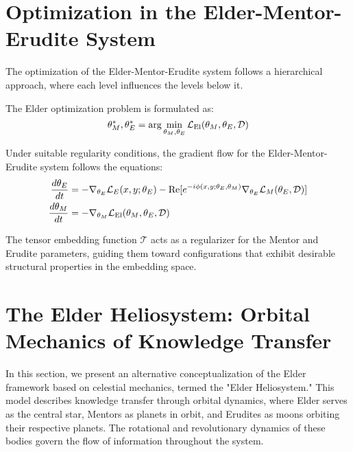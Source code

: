 \section{Optimization in the Elder-Mentor-Erudite System}

The optimization of the Elder-Mentor-Erudite system follows a hierarchical approach, where each level influences the levels below it.

\begin{definition}
The Elder optimization problem is formulated as:
\begin{equation}
\theta_M^*, \theta_E^* = \arg\min_{\theta_M, \theta_E} \mathcal{L}_{\text{El}}(\theta_M, \theta_E, \mathcal{D})
\end{equation}
\end{definition}

\begin{theorem}
Under suitable regularity conditions, the gradient flow for the Elder-Mentor-Erudite system follows the equations:
\begin{align}
\frac{d\theta_E}{dt} &= -\nabla_{\theta_E} \mathcal{L}_E(x, y; \theta_E) - \mathrm{Re}[e^{-i\phi(x,y;\theta_E,\theta_M)} \nabla_{\theta_E} \mathcal{L}_M(\theta_E, \mathcal{D})] \\
\frac{d\theta_M}{dt} &= -\nabla_{\theta_M} \mathcal{L}_{\text{El}}(\theta_M, \theta_E, \mathcal{D})
\end{align}
\end{theorem}

\begin{corollary}
The tensor embedding function $\mathcal{T}$ acts as a regularizer for the Mentor and Erudite parameters, guiding them toward configurations that exhibit desirable structural properties in the embedding space.
\end{corollary}

\section{The Elder Heliosystem: Orbital Mechanics of Knowledge Transfer}

In this section, we present an alternative conceptualization of the Elder framework based on celestial mechanics, termed the "Elder Heliosystem." This model describes knowledge transfer through orbital dynamics, where Elder serves as the central star, Mentors as planets in orbit, and Erudites as moons orbiting their respective planets. The rotational and revolutionary dynamics of these bodies govern the flow of information throughout the system.

